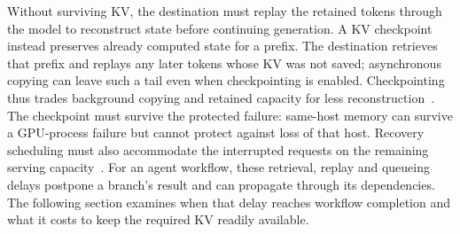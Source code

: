 Without surviving KV, the destination must replay the retained tokens
through the model to reconstruct state before continuing generation.
A KV checkpoint instead preserves already computed state for a prefix.
The destination retrieves that prefix and replays any later tokens whose
KV was not saved; asynchronous copying can leave such a tail even when
checkpointing is enabled. Checkpointing thus trades background copying
and retained capacity for less reconstruction~\cite{strati2024dejavu,jayakody2026ghostserve}.
The checkpoint must survive the protected failure: same-host memory can
survive a GPU-process failure but cannot protect against loss of that host.
Recovery scheduling must also accommodate the interrupted requests on
the remaining serving capacity~\cite{cao2026lumen}. For an agent workflow,
these retrieval, replay and queueing delays postpone a branch's result
and can propagate through its dependencies. The following section
examines when that delay reaches workflow completion and what it costs
to keep the required KV readily available.

